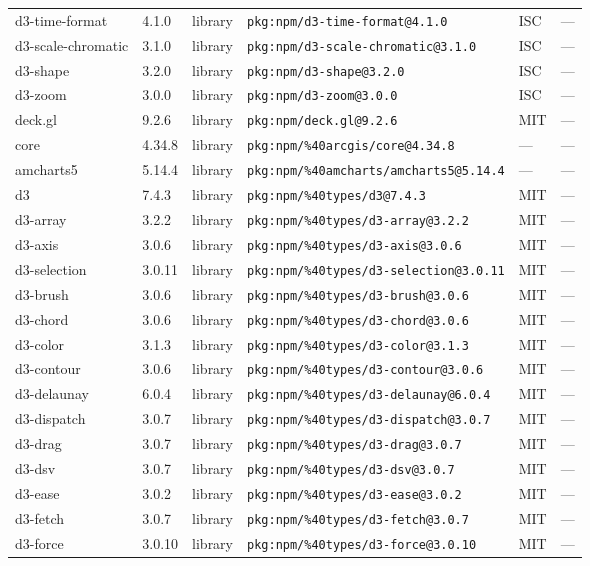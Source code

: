 \documentclass[11pt]{article}
\begin{document}
\begin{longtable}{|l|l|l|p{2.2cm}|l|p{4cm}|}
d3-time-format & 4.1.0 & library & \texttt{pkg:npm/d3-time-format@4.1.0} & ISC & — \\
d3-scale-chromatic & 3.1.0 & library & \texttt{pkg:npm/d3-scale-chromatic@3.1.0} & ISC & — \\
d3-shape & 3.2.0 & library & \texttt{pkg:npm/d3-shape@3.2.0} & ISC & — \\
d3-zoom & 3.0.0 & library & \texttt{pkg:npm/d3-zoom@3.0.0} & ISC & — \\
deck.gl & 9.2.6 & library & \texttt{pkg:npm/deck.gl@9.2.6} & MIT & — \\
core & 4.34.8 & library & \texttt{pkg:npm/\%40arcgis/core@4.34.8} & — & — \\
amcharts5 & 5.14.4 & library & \texttt{pkg:npm/\%40amcharts/amcharts5@5.14.4} & — & — \\
d3 & 7.4.3 & library & \texttt{pkg:npm/\%40types/d3@7.4.3} & MIT & — \\
d3-array & 3.2.2 & library & \texttt{pkg:npm/\%40types/d3-array@3.2.2} & MIT & — \\
d3-axis & 3.0.6 & library & \texttt{pkg:npm/\%40types/d3-axis@3.0.6} & MIT & — \\
d3-selection & 3.0.11 & library & \texttt{pkg:npm/\%40types/d3-selection@3.0.11} & MIT & — \\
d3-brush & 3.0.6 & library & \texttt{pkg:npm/\%40types/d3-brush@3.0.6} & MIT & — \\
d3-chord & 3.0.6 & library & \texttt{pkg:npm/\%40types/d3-chord@3.0.6} & MIT & — \\
d3-color & 3.1.3 & library & \texttt{pkg:npm/\%40types/d3-color@3.1.3} & MIT & — \\
d3-contour & 3.0.6 & library & \texttt{pkg:npm/\%40types/d3-contour@3.0.6} & MIT & — \\
d3-delaunay & 6.0.4 & library & \texttt{pkg:npm/\%40types/d3-delaunay@6.0.4} & MIT & — \\
d3-dispatch & 3.0.7 & library & \texttt{pkg:npm/\%40types/d3-dispatch@3.0.7} & MIT & — \\
d3-drag & 3.0.7 & library & \texttt{pkg:npm/\%40types/d3-drag@3.0.7} & MIT & — \\
d3-dsv & 3.0.7 & library & \texttt{pkg:npm/\%40types/d3-dsv@3.0.7} & MIT & — \\
d3-ease & 3.0.2 & library & \texttt{pkg:npm/\%40types/d3-ease@3.0.2} & MIT & — \\
d3-fetch & 3.0.7 & library & \texttt{pkg:npm/\%40types/d3-fetch@3.0.7} & MIT & — \\
d3-force & 3.0.10 & library & \texttt{pkg:npm/\%40types/d3-force@3.0.10} & MIT & — \\

\end{longtable}
\end{document}
